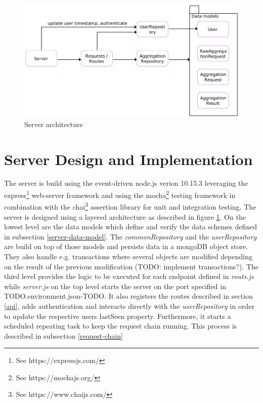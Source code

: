 \begin{figure}[h!]
  \caption{Server architecture}
  \label{server-architecture}
  \includegraphics[width=\textwidth]{data/diagrams/server-diagram.png}
\end{figure}

\section{Server Design and Implementation}\label{server}
The server is build using the event-driven node.js verion 10.15.3 leveraging the express\footnote{See https://expressjs.com/} web-server framework and using the mocha\footnote{See https://mochajs.org/} testing framework in combination with the chai\footnote{See https://www.chaijs.com/} assertion library for unit and integration testing. The server is designed using a layered architecture as described in figure \ref{server-architecture}. On the lowest level are the data models which define and verify the data schemes defined in subsection \ref{server-data-model}. The \textit{commonRepository} and the \textit{userRepository} are build on top of those models and persists data in a mongoDB object store. They also handle e.g. transactions where several objects are modified depending on the result of the previous modification (TODO: implement transactions?). The third level provides the logic to be executed for each endpoint defined in \textit{routs.js} while \textit{server.js} on the top level starts the server on the port specified in TODO.environment.json-TODO. It also registers the routes described in section \ref{api}, adds authentication and interacts directly with the \textit{userRepository} in order to update the respective users lastSeen property. Furthermore, it starts a scheduled repeating task to keep the request chain running. This process is described in subsection \ref{request-chain}

